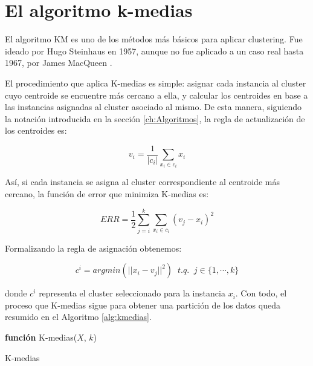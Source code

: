 \chapter{El algoritmo k-medias}\label{ap:kmeans}

El algoritmo \acf{KM} es uno de los métodos más básicos para aplicar clustering. Fue ideado por  Hugo Steinhaus en 1957, aunque no fue aplicado a un caso real hasta 1967, por James MacQueen \cite{KMEANS:1967}. 

El procedimiento que aplica K-medias es simple: asignar cada instancia al cluster cuyo centroide se encuentre más cercano a ella, y calcular los centroides en base a las instancias asignadas al cluster asociado al mismo. De esta manera, siguiendo la notación introducida en la sección \ref{ch:Algoritmos}, la regla de actualización de los centroides es:

\begin{equation}
v_i = \frac{1}{|c_i|} \sum_{x_i \in c_i} x_i
\label{a1}
\end{equation}

Así, si cada instancia se asigna al cluster correspondiente al centroide más cercano, la función de error que minimiza K-medias es:

\begin{equation}
ERR = \frac{1}{2} \sum_{j = i}^{k} \sum_{x_i \in c_i} (v_j - x_i)^2
\label{a2}
\end{equation}

Formalizando la regla de asignación obtenemos:

\begin{equation}
c^i = argmin(||x_i - v_j||^2) \;\; t.q. \;\; j \in \{1, \cdots, k\}
\label{a3}
\end{equation}

donde $c^i$ representa el cluster seleccionado para la instancia $x_i$. Con todo, el proceso que K-medias sigue para obtener una partición de los datos queda resumido en el Algoritmo \ref{alg:kmedias}.

\begin{algorithm}
	
	\BlankLine
	\BlankLine
	\textbf{función} K-medias($X$, $k$) 
	\BlankLine
	\caption{K-medias}
	\label{alg:kmedias}
\end{algorithm}


